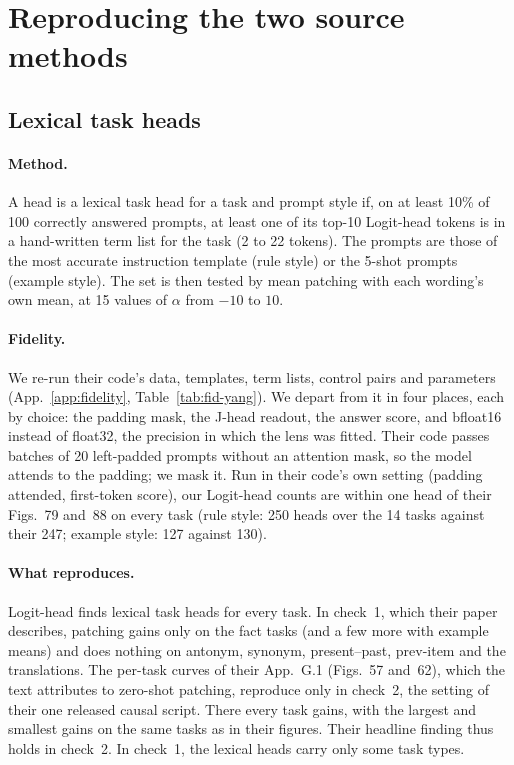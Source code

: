 \documentclass[10pt,a4paper]{article}
\begin{document}
\section{Reproducing the two source methods}\label{sec:repro}

\subsection{\texorpdfstring{Lexical task heads \citep{yang2026shared}}{Lexical task heads (Yang et al., 2026)}}

\paragraph{Method.} A head is a lexical task head for a task and prompt style if, on at least 10\% of 100 correctly answered prompts, at least one of its top-10 Logit-head tokens is in a hand-written term list for the task (2 to 22 tokens). The prompts are those of the most accurate instruction template (rule style) or the 5-shot prompts (example style). The set is then tested by mean patching with each wording's own mean, at 15 values of $\alpha$ from $-10$ to $10$.

\paragraph{Fidelity.} We re-run their code's data, templates, term lists, control pairs and parameters (App.~\ref{app:fidelity}, Table~\ref{tab:fid-yang}). We depart from it in four places, each by choice: the padding mask, the J-head readout, the answer score, and bfloat16 instead of float32, the precision in which the lens was fitted. Their code passes batches of 20 left-padded prompts without an attention mask, so the model attends to the padding; we mask it. Run in their code's own setting (padding attended, first-token score), our Logit-head counts are within one head of their Figs.~79 and~88 on every task (rule style: 250 heads over the 14 tasks against their 247; example style: 127 against 130).

\paragraph{What reproduces.} Logit-head finds lexical task heads for every task. In check~1, which their paper describes, patching gains only on the fact tasks (and a few more with example means) and does nothing on antonym, synonym, present--past, prev-item and the translations. The per-task curves of their App.~G.1 (Figs.~57 and~62), which the text attributes to zero-shot patching, reproduce only in check~2, the setting of their one released causal script. There every task gains, with the largest and smallest gains on the same tasks as in their figures. Their headline finding thus holds in check~2. In check~1, the lexical heads carry only some task types.
\end{document}
